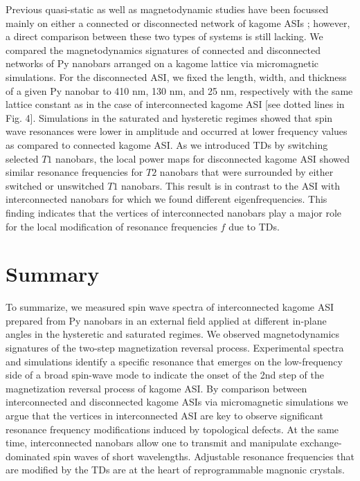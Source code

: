 \documentclass[aps,prl,preprint,showpacs,superscriptaddress,groupedaddress]{revtex4}%
\begin{document}
Previous quasi-static as well as magnetodynamic studies have been focussed mainly on either a connected or disconnected network of kagome ASIs \cite{qi2008direct,mellado2010kagome}; however, a direct comparison between these two types of systems is still lacking. We compared the magnetodynamics signatures of connected and disconnected networks of Py nanobars arranged on a kagome lattice via micromagnetic simulations. For the disconnected ASI, we fixed the length, width, and thickness of a given Py nanobar to 410 nm, 130 nm, and 25 nm, respectively with the same lattice constant as in the case of interconnected kagome ASI [see dotted lines in Fig. 4]. Simulations in the saturated and hysteretic regimes showed that spin wave resonances were lower in amplitude and occurred at lower frequency values as compared to connected kagome ASI. As we introduced TDs by switching selected $T1$ nanobars, the local power maps for disconnected kagome ASI  showed similar resonance frequencies for $T2$ nanobars that were surrounded by either switched or unswitched $T1$ nanobars. This result is in contrast to the ASI with interconnected nanobars for which we found different eigenfrequencies. This finding indicates that the vertices of interconnected nanobars play a major role for the local modification of resonance frequencies $f$ due to TDs. 

\section{Summary}
To summarize, we measured spin wave spectra of interconnected kagome ASI prepared from Py nanobars in an external field applied at different in-plane angles in the hysteretic and saturated regimes. We observed magnetodynamics signatures of the two-step magnetization reversal process.  Experimental spectra and simulations identify a specific resonance that emerges on the low-frequency side of a broad spin-wave mode to indicate the onset of the 2nd step of the magnetization reversal process of kagome ASI. By comparison between interconnected and disconnected kagome ASIs via micromagnetic simulations we argue that the vertices in interconnected ASI are key to observe significant resonance frequency modifications induced by topological defects. At the same time, interconnected nanobars allow one to transmit and manipulate exchange-dominated spin waves of short wavelengths. Adjustable resonance frequencies that are modified by the TDs are at the heart of reprogrammable magnonic crystals.
\end{document}
